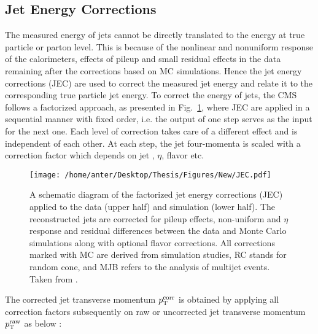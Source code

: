 \subsection{Jet Energy Corrections}
\label{sec:jet_corrections}
The measured energy of jets cannot be directly translated to the energy at true particle or parton level. This is because of the nonlinear and nonuniform response of the calorimeters, effects of pileup and small residual effects in the data remaining after the corrections based on MC simulations. Hence the jet energy corrections (JEC) \cite{Chatrchyan:2011ds, Khachatryan:2016kdb} are used to correct the measured jet energy and relate it to the corresponding true particle jet energy. To correct the energy of jets, the CMS follows a factorized approach, as presented in Fig.~\ref{fig:jec}, where JEC are applied in a sequential manner with fixed order, i.e. the output of one step serves as the input for the next one. Each level of correction takes care of a different effect and is independent of each other. At each step, the jet four-momenta is scaled with a correction factor which depends on jet \pt, $\eta$, flavor etc.

\begin{figure}[!h]
 \begin{center}
 \vspace*{4mm} 
 \hspace*{-11mm}
 \texttt{[image: /home/anter/Desktop/Thesis/Figures/New/JEC.pdf]}\\
 \vspace*{5mm}
 \caption[A schematic diagram of the factorized jet energy corrections (JEC).]{A schematic diagram of the factorized jet energy corrections (JEC) applied to the data (upper half) and simulation (lower half). The reconstructed jets are corrected for pileup effects, non-uniform \pt and $\eta$ response and residual differences between the data and Monte Carlo simulations along with optional flavor corrections. All corrections marked with MC are derived from simulation studies, RC stands for random cone, and MJB refers to the analysis of multijet events. Taken from \cite{Khachatryan:2016kdb}.}
 \label{fig:jec}
 \end{center}
\end{figure}

The corrected jet transverse momentum $p^{\rm corr}_{\rm T}$ is obtained by applying all correction factors subsequently on raw or uncorrected jet transverse momentum $p^{\rm raw}_{\rm T}$ as below :


